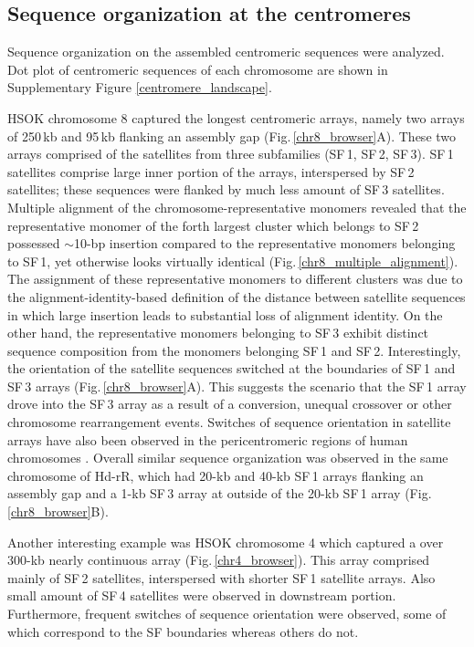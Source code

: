 \subsection*{Sequence organization at the centromeres}
  Sequence organization on the assembled centromeric sequences were analyzed. Dot plot of centromeric sequences of each chromosome are shown in Supplementary Figure \ref{centromere_landscape}.

  HSOK chromosome 8 captured the longest centromeric arrays, namely two arrays of 250\,kb and 95\,kb flanking an assembly gap (Fig.\,\ref{chr8_browser}A). These two arrays comprised of the satellites from three subfamilies (SF\,1, SF\,2, SF\,3). SF\,1 satellites comprise large inner portion of the arrays, interspersed by SF\,2 satellites; these sequences were flanked by much less amount of SF\,3 satellites. Multiple alignment of the chromosome-representative monomers revealed that the representative monomer of the forth largest cluster which belongs to SF\,2 possessed $\sim$10-bp insertion compared to the representative monomers belonging to SF\,1, yet otherwise looks virtually identical (Fig.\,\ref{chr8_multiple_alignment}). The assignment of these representative monomers to different clusters was due to the alignment-identity-based definition of the distance between satellite sequences in which large insertion leads to substantial loss of alignment identity. On the other hand, the representative monomers belonging to SF\,3 exhibit distinct sequence composition from the monomers belonging SF\,1 and SF\,2. Interestingly, the orientation of the satellite sequences switched at the boundaries of SF\,1 and SF\,3 arrays (Fig.\,\ref{chr8_browser}A). This suggests the scenario that the SF\,1 array drove into the SF\,3 array as a result of a conversion, unequal crossover or other chromosome rearrangement events. Switches of sequence orientation in satellite arrays have also been observed in the pericentromeric regions of human chromosomes \cite{M.KatharineRuddand2004}. Overall similar sequence organization was observed in the same chromosome of Hd-rR, which had 20-kb and 40-kb SF\,1 arrays flanking an assembly gap and a 1-kb SF\,3 array at outside of the 20-kb SF\,1 array (Fig.\,\ref{chr8_browser}B).

  Another interesting example was HSOK chromosome 4 which captured a over 300-kb nearly continuous array (Fig.\,\ref{chr4_browser}). This array comprised mainly of SF\,2 satellites, interspersed with shorter SF\,1 satellite arrays. Also small amount of SF\,4 satellites were observed in downstream portion. Furthermore, frequent switches of sequence orientation were observed, some of which correspond to the SF boundaries whereas others do not.


